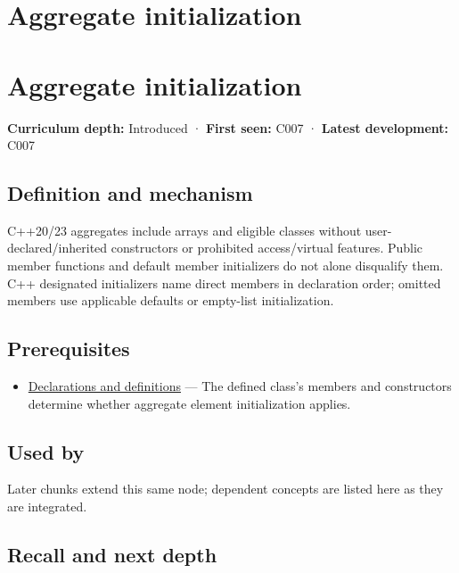 \hypertarget{appendix-b7174c179542}{}
\section*{Aggregate initialization}
\section{Aggregate initialization}\label{appendix-b7174c179542-aggregate-initialization}

\textbf{Curriculum depth:} Introduced · \textbf{First seen:} C007 · \textbf{Latest development:} C007

\subsection{Definition and mechanism}\label{appendix-b7174c179542-definition-and-mechanism}

C++20/23 aggregates include arrays and eligible classes without user-declared/inherited constructors or prohibited access/virtual features. Public member functions and default member initializers do not alone disqualify them. C++ designated initializers name direct members in declaration order; omitted members use applicable defaults or empty-list initialization.

\subsection{Prerequisites}\label{appendix-b7174c179542-prerequisites}

\begin{itemize}
\tightlist
\item
  \hyperref[appendix-2e4d494c2d94]{Declarations and definitions} --- The defined class's members and constructors determine whether aggregate element initialization applies.
\end{itemize}

\subsection{Used by}\label{appendix-b7174c179542-used-by}

Later chunks extend this same node; dependent concepts are listed here as they are integrated.

\subsection{Recall and next depth}\label{appendix-b7174c179542-recall-and-next-depth}

